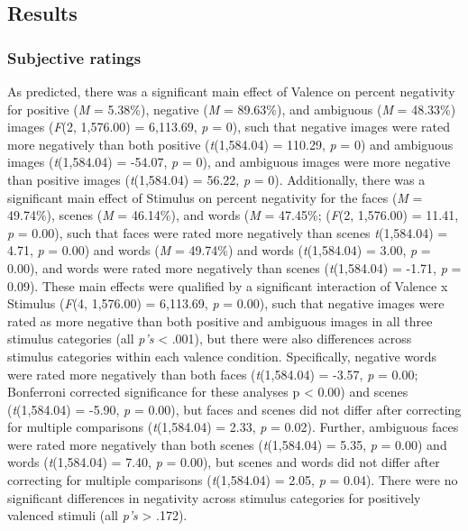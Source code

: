 \documentclass[man]{apa6}
\begin{document}
\hypertarget{results-1}{%
\subsection{Results}\label{results-1}}

\hypertarget{subjective-ratings}{%
\subsubsection{Subjective ratings}\label{subjective-ratings}}

As predicted, there was a significant main effect of Valence on percent negativity for positive (\emph{M} = 5.38\%), negative (\emph{M} = 89.63\%), and ambiguous (\emph{M} = 48.33\%) images (\emph{F}(2, 1,576.00) = 6,113.69, \emph{p} = 0), such that negative images were rated more negatively than both positive (\emph{t}(1,584.04) = 110.29, \emph{p} = 0) and ambiguous images (\emph{t}(1,584.04) = -54.07, \emph{p} = 0), and ambiguous images were more negative than positive images (\emph{t}(1,584.04) = 56.22, \emph{p} = 0). Additionally, there was a significant main effect of Stimulus on percent negativity for the faces (\emph{M} = 49.74\%), scenes (\emph{M} = 46.14\%), and words (\emph{M} = 47.45\%; (\emph{F}(2, 1,576.00) = 11.41, \emph{p} = 0.00), such that faces were rated more negatively than scenes \emph{t}(1,584.04) = 4.71, \emph{p} = 0.00) and words (\emph{M} = 49.74\%) and words (\emph{t}(1,584.04) = 3.00, \emph{p} = 0.00), and words were rated more negatively than scenes (\emph{t}(1,584.04) = -1.71, \emph{p} = 0.09). These main effects were qualified by a significant interaction of Valence x Stimulus (\emph{F}(4, 1,576.00) = 6,113.69, \emph{p} = 0.00), such that negative images were rated as more negative than both positive and ambiguous images in all three stimulus categories (all \emph{p's} \textless{} .001), but there were also differences across stimulus categories within each valence condition. Specifically, negative words were rated more negatively than both faces (\emph{t}(1,584.04) = -3.57, \emph{p} = 0.00; Bonferroni corrected significance for these analyses p \textless{} 0.00) and scenes (\emph{t}(1,584.04) = -5.90, \emph{p} = 0.00), but faces and scenes did not differ after correcting for multiple comparisons (\emph{t}(1,584.04) = 2.33, \emph{p} = 0.02). Further, ambiguous faces were rated more negatively than both scenes (\emph{t}(1,584.04) = 5.35, \emph{p} = 0.00) and words (\emph{t}(1,584.04) = 7.40, \emph{p} = 0.00), but scenes and words did not differ after correcting for multiple comparisons (\emph{t}(1,584.04) = 2.05, \emph{p} = 0.04). There were no significant differences in negativity across stimulus categories for positively valenced stimuli (all \emph{p's} \textgreater{} .172).
\end{document}
